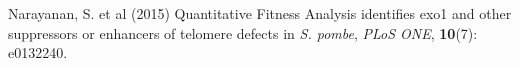 \documentclass[mathserif,handout]{beamer}
\begin{document}
{\begin{thebibliography}{}

Narayanan, S. et al (2015) \alert{Quantitative Fitness Analysis identifies exo1 and other suppressors or enhancers of telomere defects in \emph{S. pombe}}, {\em PLoS ONE}, \textbf{10}(7): e0132240.









\beamertemplatebookbibitems


\end{thebibliography}}
\end{document}

